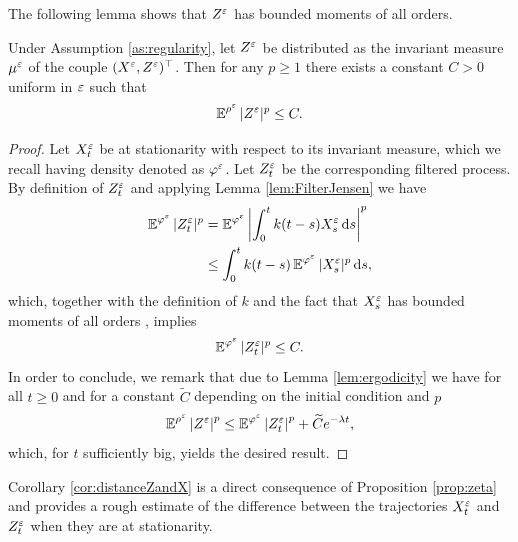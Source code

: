 \documentclass[10pt]{article}
\begin{document}
\begin{appendices}
The following lemma shows that $Z^\varepsilon$ has bounded moments of all orders.
\begin{lemma} \label{lem:bounded_momentZ}
	Under Assumption \ref{as:regularity}, let $Z^\varepsilon$ be distributed as the invariant measure $\mu^\varepsilon$ of the couple $(X^\varepsilon, Z^\varepsilon)^\top$. Then for any $p \geq 1$ there exists a constant $C > 0$ uniform in $\varepsilon$ such that 
	\begin{equation}
	\operatorname{\mathbb{E}}^{\rho^\varepsilon}|Z^\varepsilon|^p \le C.
	\end{equation}
\end{lemma}
\begin{proof} Let $X_t^\varepsilon$ be at stationarity with respect to its invariant measure, which we recall having density denoted as $\varphi^\varepsilon$. Let $Z_t^\varepsilon$ be the corresponding filtered process. By definition of $Z^\varepsilon_t$ and applying Lemma \ref{lem:FilterJensen} we have
	\begin{equation}
	\begin{aligned}
	\operatorname{\mathbb{E}}^{\varphi^\varepsilon} |Z_t^\varepsilon|^p &= \operatorname{\mathbb{E}}^{\varphi^\varepsilon} \left| \int_0^t k(t-s) X_s^\varepsilon \,\mathrm{d} s \right|^p \\
	&\leq \int_0^t k(t - s) \operatorname{\mathbb{E}}^{\varphi^\varepsilon} |X_s^\varepsilon|^p \,\mathrm{d} s,
	\end{aligned}
	\end{equation}
	which, together with the definition of $k$ and the fact that $X_s^\varepsilon$ has bounded moments of all orders \cite[Corollary 5.4]{PaS07}, implies
	\begin{equation}
	\operatorname{\mathbb{E}}^{\varphi^\varepsilon}|Z_t^\varepsilon|^p \le C.
	\end{equation}
	In order to conclude, we remark that due to Lemma \ref{lem:ergodicity} we have for all $t \geq 0$ and for a constant $\widetilde C$ depending on the initial condition and $p$  
	\begin{equation}
	\operatorname{\mathbb{E}}^{\rho^\varepsilon} \left\lvert Z^\varepsilon\right\rvert^p \leq \operatorname{\mathbb{E}}^{\varphi^\varepsilon}\left\lvert Z_t^\varepsilon\right\rvert^p + \widetilde C e^{-\lambda t},
	\end{equation}
	which, for $t$ sufficiently big, yields the desired result.
\end{proof}


Corollary \ref{cor:distanceZandX} is a direct consequence of Proposition \ref{prop:zeta} and provides a rough estimate of the difference between the trajectories $X_t^\varepsilon$ and $Z_t^\varepsilon$ when they are at stationarity.


\end{appendices}
\end{document}
